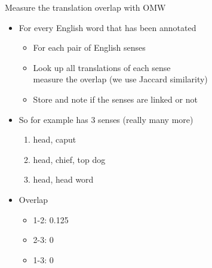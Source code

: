 \documentclass[xetex]{beamer}
\begin{document}
\begin{frame}{Measure the translation overlap with OMW}

  \begin{itemize}
  \item For every English word that has been annotated
    \begin{itemize}
    \item For each pair of English senses
    \item Look up all translations of each sense
      \\ measure the overlap (we use Jaccard similarity)
      \item Store and note if the senses are linked or not
    \end{itemize}
  \item So for example  has 3 senses (really many more)
    \begin{enumerate}
    \item head, caput
      \\ 
    \item head, chief, top dog
      \\ 
    \item head,  head word
      \\ 
    \end{enumerate}
  \item Overlap
    \begin{itemize}
    \item 1-2: 0.125 %
    \item 2-3: 0
    \item 1-3: 0
    \end{itemize}
  \end{itemize}
  

\end{frame}
\end{document}
